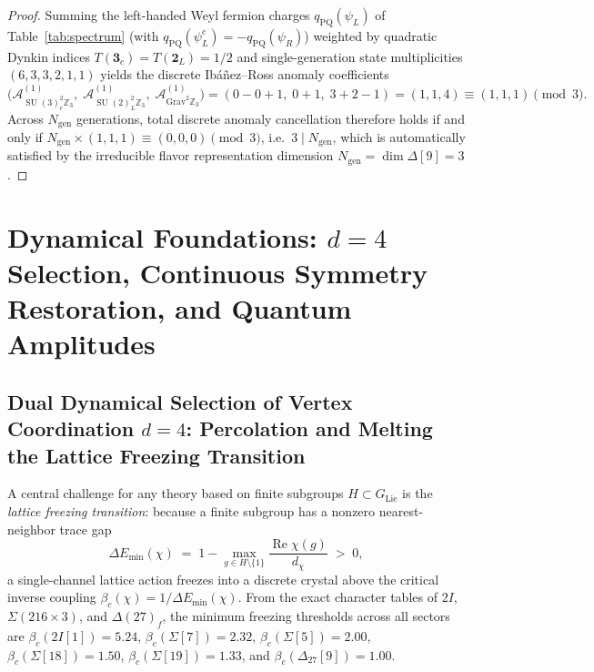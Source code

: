 \documentclass[11pt,a4paper]{article}
\theoremstyle{definition}
\theoremstyle{remark}
\newcommand{\Z}{\mathbb{Z}}
\newcommand{\SU}{\operatorname{SU}}
\begin{document}
\begin{proof}
Summing the left-handed Weyl fermion charges $q_{\mathrm{PQ}}(\psi_L)$ of Table~\ref{tab:spectrum} (with $q_{\mathrm{PQ}}(\psi^c_L) = -q_{\mathrm{PQ}}(\psi_R)$) weighted by quadratic Dynkin indices $T(\mathbf{3}_c) = T(\mathbf{2}_L) = 1/2$ and single-generation state multiplicities $(6, 3, 3, 2, 1, 1)$ yields the discrete Ib\'a\~nez--Ross anomaly coefficients~\cite{IbanezRoss1991}
\[
\bigl(\mathcal{A}_{\SU(3)_c^2\Z_3}^{(1)},\; \mathcal{A}_{\SU(2)_L^2\Z_3}^{(1)},\; \mathcal{A}_{\mathrm{Grav}^2\Z_3}^{(1)}\bigr) = (0 - 0 + 1,\; 0 + 1,\; 3 + 2 - 1) = (1, 1, 4) \equiv (1, 1, 1) \pmod 3.
\]
Across $N_{\mathrm{gen}}$ generations, total discrete anomaly cancellation therefore holds if and only if $N_{\mathrm{gen}} \times (1, 1, 1) \equiv (0, 0, 0) \pmod 3$, i.e.\ $3 \mid N_{\mathrm{gen}}$, which is automatically satisfied by the irreducible flavor representation dimension $N_{\mathrm{gen}} = \dim\Delta[9] = 3$.
\end{proof}

\section{Dynamical Foundations: \texorpdfstring{$d=4$}{d=4} Selection, Continuous Symmetry Restoration, and Quantum Amplitudes}

\subsection{Dual Dynamical Selection of Vertex Coordination $d=4$: Percolation and Melting the Lattice Freezing Transition}

A central challenge for any theory based on finite subgroups $H \subset G_{\mathrm{Lie}}$ is the \emph{lattice freezing transition}: because a finite subgroup has a nonzero nearest-neighbor trace gap
\begin{equation}
\label{eq:trace_gap}
\Delta E_{\min}(\chi) \;=\; 1 - \max_{g \in H \setminus \{1\}} \frac{\operatorname{Re}\chi(g)}{d_\chi} \;>\; 0,
\end{equation}
a single-channel lattice action freezes into a discrete crystal above the critical inverse coupling $\beta_c(\chi) = 1 / \Delta E_{\min}(\chi)$. From the exact character tables of $2I$, $\Sigma(216 \times 3)$, and $\Delta(27)_f$, the minimum freezing thresholds across all sectors are $\beta_c(2I[1]) = 5.24$, $\beta_c(\Sigma[7]) = 2.32$, $\beta_c(\Sigma[5]) = 2.00$, $\beta_c(\Sigma[18]) = 1.50$, $\beta_c(\Sigma[19]) = 1.33$, and $\beta_c(\Delta_{27}[9]) = 1.00$.
\end{document}
